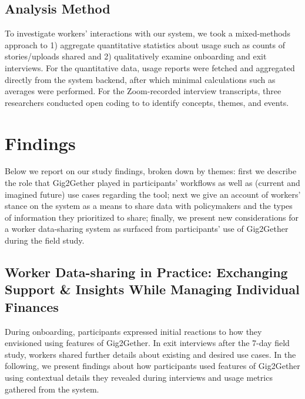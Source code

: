 \subsection{Analysis Method}
To investigate workers' interactions with our system, we took a mixed-methods approach to 1) aggregate quantitative statistics about usage such as counts of stories/uploads shared and 2) qualitatively examine onboarding and exit interviews. 
For the quantitative data, usage reports were fetched and aggregated directly from the system backend, after which minimal calculations such as averages were performed.
For the Zoom-recorded interview transcripts, three researchers conducted open coding to to identify concepts, themes, and events. 

\section{Findings}
Below we report on our study findings, broken down by themes: first we describe {the role that Gig2Gether played in} participants' workflows as well as {(current and imagined future)} use cases regarding the tool; next we give an account of workers' stance on the system as a means to share data with policymakers and the types of information they prioritized to share; {finally, we present new considerations for a worker data-sharing system as surfaced from participants' use of Gig2Gether during the field study}.

\subsection{Worker Data-sharing in Practice{: Exchanging Support \& Insights While Managing Individual Finances}}
During onboarding, participants expressed initial reactions to how they envisioned using features of Gig2Gether. 
{In} exit interview{s after the 7-day field study}, workers {shared further }details about {existing and desired use cases.}
In the following, we present findings about how participants used features of Gig2Gether using contextual details they revealed during interviews and usage metrics gathered from the system.


